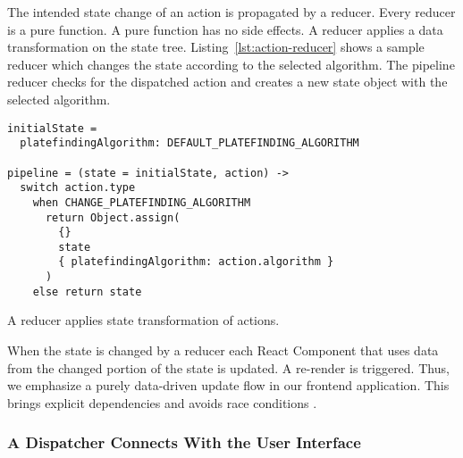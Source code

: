 \documentclass[../../ClassicThesis.tex]{subfiles}
\begin{document}
The intended state change of an action is propagated by a
reducer. Every reducer is a pure function. A pure function
has no side effects. A reducer applies a data transformation
on the state tree. Listing~\ref{lst:action-reducer} shows a
sample reducer which changes the state according to the
selected algorithm. The pipeline reducer checks for
the dispatched action and creates a new state object with the
selected algorithm.

\begin{listing}[h]
\begin{verbatim}
initialState =
  platefindingAlgorithm: DEFAULT_PLATEFINDING_ALGORITHM

pipeline = (state = initialState, action) ->
  switch action.type
    when CHANGE_PLATEFINDING_ALGORITHM
      return Object.assign(
        {}
        state
        { platefindingAlgorithm: action.algorithm }
      )
    else return state
\end{verbatim}
\caption{A reducer applies state transformation of actions.}
\label{lst:action-reducer}
\end{listing}

When the state is changed by a reducer each React Component
that uses data from the changed portion of the state is
updated. A re-render is triggered. Thus, we emphasize a
purely data-driven update flow in our frontend application.
This brings explicit dependencies and avoids race conditions
\cite{redux}.

\subsubsection{A Dispatcher Connects {\convertify} With the User
  Interface}
\label{dispatch-and-dispatcher}


\end{document}
